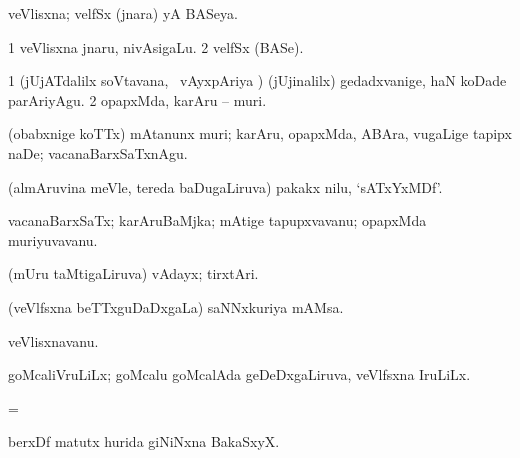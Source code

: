 {{{\bentry
{} 
\gl{\gu}
\expl{}
\bmng
veVlisxna; velfSx (jnara) yA BASeya. 
\emng
\eentry

\bentry
{} 
\gl{\nA}
\expl{}
\bmng
\bnum
\num{1} veVlisxna jnaru, nivAsigaLu. 
\num{2} velfSx (BASe). 
\enum
\emng
\eentry

\bentry
{} 
\gl{\akirx}
\expl{}
\bmng
\bnum
\num{1} (jUjATdalilx soVtavana, \kanmu\ vAyxpAriya \vi) (jUjinalilx) gedadxvanige, haN koDade parAriyAgu. 
\num{2} opapxMda, karAru -- muri. 
\enum
\emng

\noindent 
\gl{\pagu}
\expl{}
\bmng
{} (obabxnige koTTx) mAtanunx muri; karAru, opapxMda, ABAra, \mo vugaLige tapipx naDe; vacanaBarxSaTxnAgu. 
\emng
\eentry

\bentry
{} 
\gl{\nA}
\expl{}
\bmng
{} 
\emng
\eentry

\bentry
{} 
\gl{\nA}
\expl{}
\bmng
(almAruvina meVle, tereda baDugaLiruva) pakakx nilu, `sATxYxMDf'. 
\emng
\eentry

\bentry
{} 
\gl{\nA}
\expl{}
\bmng
vacanaBarxSaTx; karAruBaMjka; mAtige tapupxvavanu; opapxMda muriyuvavanu. 
\emng
\eentry

\bentry
{} 
\gl{\nA}
\expl{}
\bmng
(mUru taMtigaLiruva) vAdayx; tirxtAri. 
\emng
\eentry

\bentry
{} 
\gl{\nA}
\expl{}
\bmng
(veVlfsxna beTTxguDaDxgaLa) saNNxkuriya mAMsa. 
\emng
\eentry

\bentry
{} 
\gl{\nA}
\bmng
veVlisxnavanu. 
\emng
\eentry

\bentry
{} 
\gl{\nA}
\expl{}
\bmng
{} 
\emng
\eentry

\bentry
{} 
\gl{\nA}
\expl{}
\bmng
goMcaliVruLiLx; goMcalu goMcalAda geDeDxgaLiruva, veVlfsxna IruLiLx. 
\emng
\eentry

\bentry
{} 
\gl{\nA}
\expl{}
\bmng
=  
\emng
\eentry

\bentry
{} 
\gl{\nA}
\expl{}
\bmng
berxDf matutx hurida giNiNxna BakaSxyX. 
\emng
\eentry

}}}
